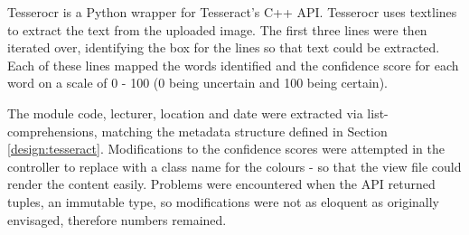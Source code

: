 {{{{{{{Tesserocr is a Python wrapper for Tesseract's  C++ API. Tesserocr uses textlines to extract the text from the uploaded image. The first three lines were then iterated over, identifying the box for the lines so that text could be extracted. Each of these lines mapped the words identified and the confidence score for each word on a scale of 0 - 100 (0 being uncertain and 100 being certain).

The module code, lecturer, location and date were extracted via list-comprehensions, matching the metadata structure defined in Section \ref{design:tesseract}. Modifications to the confidence scores were attempted in the controller to replace with a class name for the colours - so that the view file could render the content easily. Problems were encountered when the API returned tuples, an immutable type, so modifications were not as eloquent as originally envisaged, therefore numbers remained.

}}}}}}}
